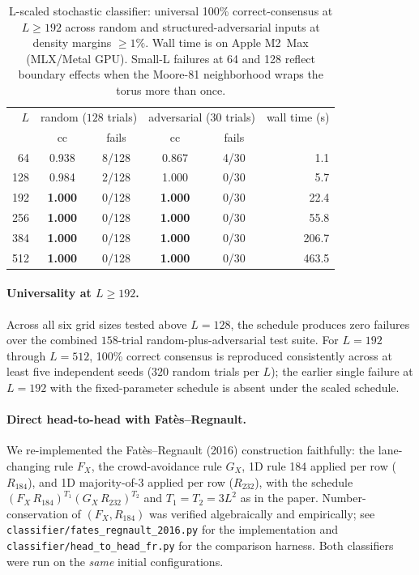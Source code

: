 \documentclass[11pt,a4paper]{article}
\newcommand{\fpath}[1]{\nolinkurl{#1}}
\begin{document}
\begin{table}[h]\centering\small
\begin{tabular}{r cc cc r}
\toprule
$L$ & \multicolumn{2}{c}{random (\(128\) trials)}
     & \multicolumn{2}{c}{adversarial (\(30\) trials)}
     & wall time (s) \\
 & cc & fails & cc & fails & \\
\midrule
64  & 0.938 & 8/128 & 0.867 & 4/30 & 1.1 \\
128 & 0.984 & 2/128 & 1.000 & 0/30 & 5.7 \\
192 & \textbf{1.000} & 0/128 & \textbf{1.000} & 0/30 & 22.4 \\
256 & \textbf{1.000} & 0/128 & \textbf{1.000} & 0/30 & 55.8 \\
384 & \textbf{1.000} & 0/128 & \textbf{1.000} & 0/30 & 206.7 \\
512 & \textbf{1.000} & 0/128 & \textbf{1.000} & 0/30 & 463.5 \\
\bottomrule
\end{tabular}
\caption{L-scaled stochastic classifier: universal 100\% correct-consensus at
\(L\geq 192\) across random and structured-adversarial inputs at density
margins \(\geq 1\%\).  Wall time is on Apple M2~Max (MLX/Metal GPU).  Small-L
failures at 64 and 128 reflect boundary effects when the Moore-81
neighborhood wraps the torus more than once.}
\label{tab:scaled-universal}
\end{table}

\paragraph{Universality at \(L\geq 192\).}  Across all six grid sizes tested
above \(L=128\), the schedule produces zero failures over the combined
\(158\)-trial random-plus-adversarial test suite.  For \(L=192\) through
\(L=512\), 100\% correct consensus is reproduced consistently across at
least five independent seeds (\(320\) random trials per \(L\)); the earlier
single failure at \(L=192\) with the fixed-parameter schedule is absent
under the scaled schedule.

\paragraph{Direct head-to-head with Fat\`{e}s--Regnault.}
\label{par:h2h}
We re-implemented the Fat\`{e}s--Regnault (2016) construction
faithfully: the lane-changing rule \(F_X\), the crowd-avoidance rule
\(G_X\), 1D rule 184 applied per row (\(R_{184}\)), and 1D
majority-of-3 applied per row (\(R_{232}\)), with the schedule
\((F_X\,R_{184})^{T_1}(G_X\,R_{232})^{T_2}\) and \(T_1=T_2=3L^2\) as
in the paper.  Number-conservation of \((F_X,R_{184})\) was verified
algebraically and empirically; see
\fpath{classifier/fates_regnault_2016.py} for the implementation
and \fpath{classifier/head_to_head_fr.py} for the comparison
harness.  Both classifiers were run on the \emph{same} initial
configurations.
\end{document}
